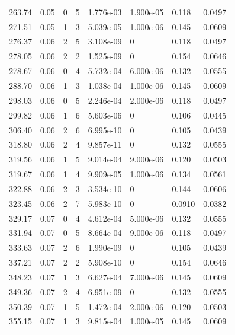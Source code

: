 \documentclass[preview]{standalone}
\begin{document}
{{{\begin{tabular}{L{1.2cm}C{1.2cm} C{0.3cm}C{0.5cm} C{1.4cm}C{1.4cm} C{1.4cm}C{1.4cm}}
  263.74  &  0.05  & 0     &  5 &  1.776e-03  & 1.900e-05  & 0.118 &  0.0497   \\ 
  271.51  &  0.05  & 1     &  3 &  5.039e-05  & 1.000e-06  & 0.145 &  0.0609   \\ 
  276.37  &  0.06  & 2     &  5 &  3.108e-09  & 0  & 0.118 &  0.0497   \\ 
  278.05  &  0.06  & 2     &  2 &  1.525e-09  & 0  & 0.154 &  0.0646   \\ 
  278.67  &  0.06  & 0     &  4 &  5.732e-04  & 6.000e-06  & 0.132 &  0.0555   \\ 
  288.70  &  0.06  & 1     &  3 &  1.038e-04  & 1.000e-06  & 0.145 &  0.0609   \\ 
  298.03  &  0.06  & 0     &  5 &  2.246e-04  & 2.000e-06  & 0.118 &  0.0497   \\ 
  299.82  &  0.06  & 1     &  6 &  5.603e-06  & 0  & 0.106 &  0.0445   \\ 
  306.40  &  0.06  & 2     &  6 &  6.995e-10  & 0  & 0.105 &  0.0439   \\ 
  318.80  &  0.06  & 2     &  4 &  9.857e-11  & 0  & 0.132 &  0.0555   \\ 
  319.56  &  0.06  & 1     &  5 &  9.014e-04  & 9.000e-06  & 0.120 &  0.0503   \\ 
  319.67  &  0.06  & 1     &  4 &  9.909e-05  & 1.000e-06  & 0.134 &  0.0561   \\ 
  322.88  &  0.06  & 2     &  3 &  3.534e-10  & 0  & 0.144 &  0.0606   \\ 
  323.45  &  0.06  & 2     &  7 &  5.983e-10  & 0  & 0.0910 &  0.0382   \\ 
  329.17  &  0.07  & 0     &  4 &  4.612e-04  & 5.000e-06  & 0.132 &  0.0555   \\ 
  331.94  &  0.07  & 0     &  5 &  8.664e-04  & 9.000e-06  & 0.118 &  0.0497   \\ 
  333.63  &  0.07  & 2     &  6 &  1.990e-09  & 0  & 0.105 &  0.0439   \\ 
  337.21  &  0.07  & 2     &  2 &  5.908e-10  & 0  & 0.154 &  0.0646   \\ 
  348.23  &  0.07  & 1     &  3 &  6.627e-04  & 7.000e-06  & 0.145 &  0.0609   \\ 
  349.36  &  0.07  & 2     &  4 &  6.951e-09  & 0  & 0.132 &  0.0555   \\ 
  350.39  &  0.07  & 1     &  5 &  1.472e-04  & 2.000e-06  & 0.120 &  0.0503   \\ 
  355.15  &  0.07  & 1     &  3 &  9.815e-04  & 1.000e-05  & 0.145 &  0.0609   \\ 

\end{tabular}}}}
\end{document}
